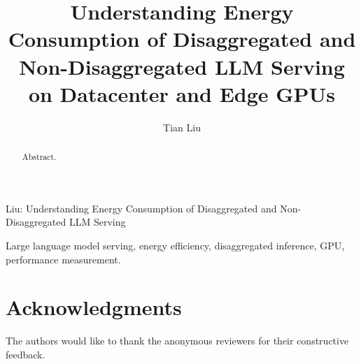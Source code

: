 \documentclass[10pt,journal,compsoc]{IEEEtran}
\begin{document}
\title{Understanding Energy Consumption of Disaggregated and Non-Disaggregated LLM Serving on Datacenter and Edge GPUs}

\author{Tian Liu%
%
}

%
{Liu: Understanding Energy Consumption of Disaggregated and Non-Disaggregated LLM Serving}

\maketitle

\begin{abstract}
Abstract.
\end{abstract}

\begin{IEEEkeywords}
Large language model serving, energy efficiency, disaggregated inference, GPU, performance measurement.
\end{IEEEkeywords}









\section*{Acknowledgments}
The authors would like to thank the anonymous reviewers for their constructive feedback.



\end{document}
